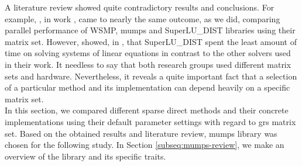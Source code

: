 A literature review showed quite contradictory results and conclusions. For example, \citeauthor{wsmp}, in work \cite{wsmp}, came to nearly the same outcome, as we did, comparing parallel performance of WSMP, \acrshort{mumps} and SuperLU\_DIST libraries using their matrix set. However, \citeauthor{mm-comparison-of-packages} showed, in \cite{mm-comparison-of-packages}, that SuperLU\_DIST spent the least amount of time on solving  systems of linear equations in contrast to the other solvers used in their work. It needless to say that both research groups used different matrix sets and hardware. Nevertheless, it reveals a quite important fact that a selection of a particular method and its implementation can depend heavily on a specific matrix set.\\


In this section, we compared different sparse direct methods and their concrete implementations using their default parameter settings with regard to \acrshort{grs} matrix set. Based on the obtained results and literature review, \acrshort{mumps} library was chosen for the following study. In Section \ref{subseq:mumps-review}, we make an overview of the library and its specific traits. \\
